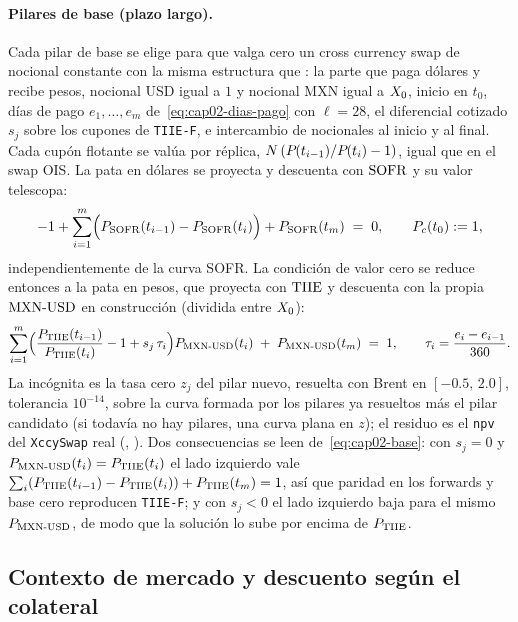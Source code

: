 \paragraph{Pilares de base (plazo largo).} Cada pilar de base se elige para que valga cero un cross currency swap de
nocional constante con la misma estructura que : la parte que paga
dólares y recibe pesos, nocional USD igual a $1$ y nocional MXN igual a $X_0$, inicio en $t_0$, días de pago
$e_1,\dots,e_m$ de~\eqref{eq:cap02-dias-pago} con $\ell=28$, el diferencial cotizado $s_j$ sobre los cupones de
\texttt{TIIE-F}, e intercambio de nocionales al inicio y al final. Cada cupón flotante se valúa por réplica,
$N\,(P_{}(t_{i-1})/P_{}(t_i)-1)$, igual que en el swap OIS. La pata en dólares se proyecta y descuenta con
$\mathrm{SOFR}$ y su valor telescopa:
\begin{equation}\label{eq:cap02-pata-usd}
  -1 + \sum_{i=1}^{m}\Bigl(P_{\mathrm{SOFR}}(t_{i-1}) - P_{\mathrm{SOFR}}(t_i)\Bigr) + P_{\mathrm{SOFR}}(t_m) \;=\; 0,
  \qquad P_{c}(t_0):=1,
\end{equation}
independientemente de la curva SOFR. La condición de valor cero se reduce entonces a la pata en pesos, que
proyecta con $\mathrm{TIIE}$ y descuenta con la propia $\mathrm{MXN\text{-}USD}$ en construcción (dividida entre $X_0$):
\begin{equation}\label{eq:cap02-base}
  \sum_{i=1}^{m}\Bigl(\frac{P_{\mathrm{TIIE}}(t_{i-1})}{P_{\mathrm{TIIE}}(t_i)} - 1 + s_j\,\tau_i\Bigr)P_{\mathrm{MXN\text{-}USD}}(t_i)
  \;+\; P_{\mathrm{MXN\text{-}USD}}(t_m) \;=\; 1,
  \qquad \tau_i=\frac{e_i-e_{i-1}}{360}.
\end{equation}
La incógnita es la tasa cero $z_j$ del pilar nuevo, resuelta con Brent en $[-0.5,\,2.0]$, tolerancia $10^{-14}$,
sobre la curva formada por los pilares ya resueltos más el pilar candidato (si todavía no hay pilares, una curva
plana en $z$); el residuo es el \texttt{npv} del \texttt{XccySwap} real
(, ).
Dos consecuencias se leen de~\eqref{eq:cap02-base}: con $s_j=0$ y $P_{\mathrm{MXN\text{-}USD}}(t_i)=P_{\mathrm{TIIE}}(t_i)$ el lado
izquierdo vale $\sum_i(P_{\mathrm{TIIE}}(t_{i-1})-P_{\mathrm{TIIE}}(t_i))+P_{\mathrm{TIIE}}(t_m)=1$, así que paridad en los forwards
y base cero reproducen \texttt{TIIE-F}; y con $s_j<0$ el lado izquierdo baja para el mismo $P_{\mathrm{MXN\text{-}USD}}$, de modo
que la solución lo sube por encima de $P_{\mathrm{TIIE}}$.

\subsection{Contexto de mercado y descuento según el colateral}\label{sec:cap02-contexto}

